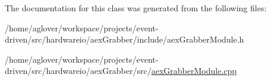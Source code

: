 The documentation for this class was generated from the following files\+:\begin{DoxyCompactItemize}
\item 
/home/aglover/workspace/projects/event-\/driven/src/hardwareio/aex\+Grabber/include/aex\+Grabber\+Module.\+h\item 
/home/aglover/workspace/projects/event-\/driven/src/hardwareio/aex\+Grabber/src/\hyperlink{aexGrabberModule_8cpp}{aex\+Grabber\+Module.\+cpp}\end{DoxyCompactItemize}
